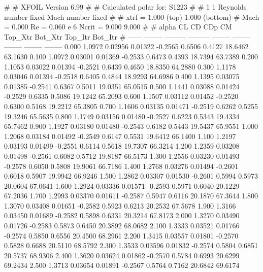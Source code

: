 #  
#       XFOIL         Version 6.99
#  
# Calculated polar for: S1223                                           
#  
# 1 1 Reynolds number fixed          Mach number fixed         
#  
# xtrf =   1.000 (top)        1.000 (bottom)  
# Mach =   0.000     Re =     0.060 e 6     Ncrit =   9.000  9.000
#  
#   alpha    CL        CD       CDp       CM     Top_Xtr  Bot_Xtr  Top_Itr  Bot_Itr
#  ------ -------- --------- --------- -------- -------- -------- -------- --------
   0.000   1.0972   0.02956   0.01322  -0.2565   0.6506   0.4127  18.6462  63.1630
   0.100   1.0972   0.03001   0.01369  -0.2533   0.6473   0.4393  18.7394  63.7389
   0.200   1.1053   0.03022   0.01394  -0.2521   0.6439   0.4650  18.8350  64.2880
   0.300   1.1178   0.03046   0.01394  -0.2518   0.6405   0.4844  18.9293  64.6986
   0.400   1.1395   0.03075   0.01385  -0.2541   0.6367   0.5011  19.0351  65.0515
   0.500   1.1441   0.03088   0.01424  -0.2529   0.6335   0.5086  19.1242  65.2093
   0.600   1.1507   0.03112   0.01452  -0.2520   0.6300   0.5168  19.2212  65.3805
   0.700   1.1606   0.03135   0.01471  -0.2519   0.6262   0.5255  19.3246  65.5635
   0.800   1.1749   0.03156   0.01480  -0.2527   0.6223   0.5343  19.4334  65.7462
   0.900   1.1927   0.03180   0.01480  -0.2543   0.6182   0.5443  19.5437  65.9551
   1.000   1.2068   0.03184   0.01492  -0.2549   0.6147   0.5531  19.6412  66.1400
   1.100   1.2197   0.03193   0.01499  -0.2551   0.6114   0.5618  19.7307  66.3214
   1.200   1.2359   0.03208   0.01498  -0.2561   0.6082   0.5712  19.8187  66.5173
   1.300   1.2556   0.03230   0.01493  -0.2578   0.6050   0.5808  19.9061  66.7186
   1.400   1.2768   0.03276   0.01494  -0.2601   0.6018   0.5907  19.9942  66.9246
   1.500   1.2862   0.03307   0.01530  -0.2601   0.5994   0.5973  20.0604  67.0641
   1.600   1.2924   0.03336   0.01571  -0.2593   0.5971   0.6040  20.1229  67.2036
   1.700   1.2993   0.03370   0.01611  -0.2587   0.5947   0.6116  20.1870  67.3644
   1.800   1.3070   0.03408   0.01651  -0.2582   0.5923   0.6213  20.2532  67.5678
   1.900   1.3166   0.03450   0.01689  -0.2582   0.5898   0.6331  20.3214  67.8173
   2.000   1.3270   0.03490   0.01726  -0.2583   0.5873   0.6450  20.3892  68.0682
   2.100   1.3333   0.03521   0.01766  -0.2574   0.5850   0.6556  20.4500  68.2961
   2.200   1.3415   0.03557   0.01801  -0.2570   0.5828   0.6688  20.5110  68.5792
   2.300   1.3533   0.03596   0.01832  -0.2574   0.5804   0.6851  20.5737  68.9306
   2.400   1.3620   0.03624   0.01862  -0.2570   0.5784   0.6993  20.6299  69.2434
   2.500   1.3713   0.03654   0.01891  -0.2567   0.5764   0.7162  20.6842  69.6174
